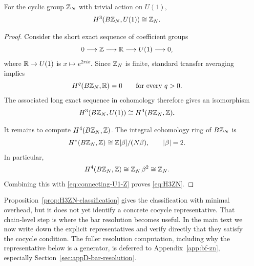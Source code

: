 \begin{proposition}\label{prop:H3ZN-classification}
For the cyclic group $\mathbb{Z}_N$ with trivial action on $U(1)$,
\begin{equation}\label{eq:H3ZN}
H^3(B\mathbb{Z}_N,U(1))\cong \mathbb{Z}_N.
\end{equation}
\end{proposition}

\begin{proof}
Consider the short exact sequence of coefficient groups
\begin{equation*}
0\longrightarrow \mathbb{Z} \longrightarrow \mathbb{R} \longrightarrow U(1)\longrightarrow 0,
\end{equation*}
where $\mathbb{R}\to U(1)$ is $x\mapsto e^{2\pi i x}$. Since $\mathbb{Z}_N$ is finite, standard transfer averaging implies
\begin{equation*}
H^q(B\mathbb{Z}_N,\mathbb{R})=0
\qquad
\text{for every }q>0.
\end{equation*}
The associated long exact sequence in cohomology therefore gives an isomorphism
\begin{equation}\label{eq:connecting-U1-Z}
H^3(B\mathbb{Z}_N,U(1))\cong H^4(B\mathbb{Z}_N,\mathbb{Z}).
\end{equation}

\medskip

\noindent It remains to compute $H^4(B\mathbb{Z}_N,\mathbb{Z})$. The integral cohomology ring of $B\mathbb{Z}_N$ is
\begin{equation}\label{eq:cohomology-ring-BZN}
H^*(B\mathbb{Z}_N,\mathbb{Z})\cong \mathbb{Z}[\beta]/(N\beta),
\qquad
|\beta|=2.
\end{equation}
In particular,
\begin{equation*}
H^4(B\mathbb{Z}_N,\mathbb{Z})\cong \mathbb{Z}_N\,\beta^2\cong \mathbb{Z}_N.
\end{equation*}
Combining this with \eqref{eq:connecting-U1-Z} proves \eqref{eq:H3ZN}.
\end{proof}

\begin{remark}\label{rem:H3ZN-main-vs-app}
Proposition~\ref{prop:H3ZN-classification} gives the classification with minimal overhead, but it does not yet identify a concrete cocycle representative. That chain-level step is where the bar resolution becomes useful. In the main text we now write down the explicit representatives and verify directly that they satisfy the cocycle condition. The fuller resolution computation, including why the representative below is a generator, is deferred to Appendix~\ref{app:bf-zn}, especially Section~\ref{sec:appD-bar-resolution}.
\end{remark}

